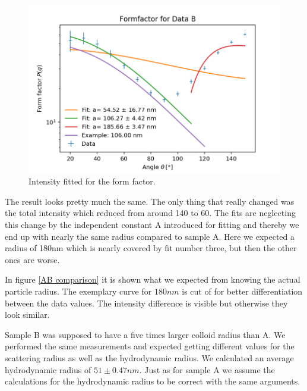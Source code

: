 \documentclass[]{article}
\begin{document}
\begin{figure}[!htbp]
\centering
\includegraphics[width=0.8\linewidth]{Plots/FormB.png}
\caption{Intensity fitted for the form factor.}
\label{FormB}
\end{figure}

The result looks pretty much the same. The only thing that really changed was the total intensity which reduced from around 140 to 60. The fits are neglecting this change by the independent constant A introduced for fitting and thereby we end up with nearly the same radius compared to sample A. 
Here we expected a radius of 180nm which is nearly covered by fit number three, but then the other ones are worse.

In figure  \ref{AB comparison} it is shown what we expected from knowing the actual particle radius. The exemplary curve for $180nm$ is cut of for better differentiation between the data values. The intensity difference is visible but otherwise they look similar. 


Sample B was supposed to have a five times larger colloid radius than A. We performed the same measurements and expected getting different values for the scattering radius as well as the hydrodynamic radius. 
We calculated an average hydrodynamic radius of $51 \pm 0.47 nm$. Just as for sample A we assume the calculations for the hydrodynamic radius to be correct with the same arguments.
\end{document}
